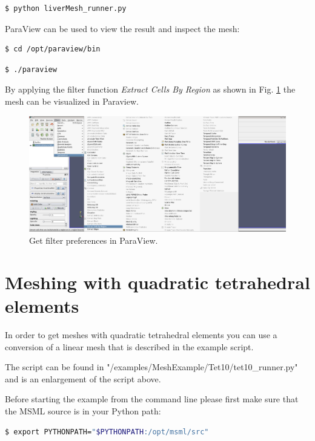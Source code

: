 \begin{lstlisting}[language=sh, breaklines=true]
$ python liverMesh_runner.py
\end{lstlisting}

ParaView can be used to view the result and inspect the mesh:
\begin{lstlisting}[language=sh, breaklines=true]
$ cd /opt/paraview/bin
\end{lstlisting}
\begin{lstlisting}[language=sh, breaklines=true]
$ ./paraview
\end{lstlisting}

By applying the filter function \emph{Extract Cells By Region} as shown in Fig. \ref{ParaviewFilterScreenshot} the mesh can be visualized in Paraview. 

\begin{figure}[h]
  	\centering
    \includegraphics[width=\textwidth]{pictures/paraview_filter.png}
    \caption{Get filter preferences in ParaView.}
    \label{ParaviewFilterScreenshot}
\end{figure}

\newpage

\section{Meshing with quadratic tetrahedral elements}
In order to get meshes with quadratic tetrahedral elements you can use a conversion of a linear mesh that is described in the example script.

The script can be found in "/examples/MeshExample/Tet10/tet10\_runner.py" and is an enlargement of the script above.

Before starting the example from the command line please first make sure that the MSML source is in your Python path:
\begin{lstlisting}[language=sh, breaklines=true]
$ export PYTHONPATH="$PYTHONPATH:/opt/msml/src"
\end{lstlisting}

